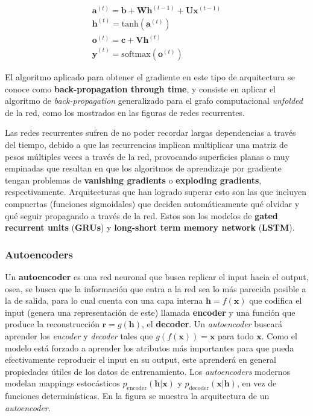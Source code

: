 \begin{equation}
\begin{array}{l}
\bm{a}^{(t)} = \bm{b} + \bm{W}\bm{h}^{(t-1)}+\bm{U}\bm{x}^{(t-1)} \\
\bm{h}^{(t)} = \textrm{tanh}(\bm{a}^{(t)}) \\
\bm{o}^{(t)} = \bm{c} + \bm{V}\bm{h}^{(t)} \\
\hat{\bm{y}}^{(t)} = \textrm{softmax}(\bm{o}^{(t)})
\end{array}
\end{equation}

El algoritmo aplicado para obtener el gradiente en este tipo de arquitectura se conoce como \textbf{back-propagation through time}, y consiste en aplicar el algoritmo de \textit{back-propagation} generalizado para el grafo computacional \textit{unfolded} de la red, como los mostrados en las figuras de redes recurrentes.

Las redes recurrentes sufren de no poder recordar largas dependencias a trav\'es del tiempo, debido a que las recurrencias implican multiplicar una matriz de pesos m\'ultiples veces a trav\'es de la red, provocando superficies planas o muy empinadas que resultan en que los algoritmos de aprendizaje por gradiente tengan problemas de \textbf{vanishing gradients} o \textbf{exploding gradients}, respectivamente. Arquitecturas que han logrado superar esto son las que incluyen compuertas (funciones sigmoidales) que deciden autom\'aticamente qu\'e olvidar y qu\'e seguir propagando a trav\'es de la red. Estos son los modelos de \textbf{gated recurrent units} (\textbf{GRUs}) y \textbf{long-short term memory network} (\textbf{LSTM}).

\subsubsection{Autoencoders}

Un \textbf{autoencoder} es una red neuronal que busca replicar el input hacia el output, osea, se busca que la información que entra a la red sea lo más parecida posible a la de salida, para lo cual cuenta con una capa interna $\bm{h} = f(\bm{x})$ que codifica el input (genera una representaci\'on de este) llamada \textbf{encoder} y una funci\'on que produce la reconstrucci\'on $\bm{r} = g(\bm{h})$, el \textbf{decoder}. Un \textit{autoencoder} buscar\'a aprender los \textit{encoder} y \textit{decoder} tales que $g(f(\bm{x})) = \bm{x}$ para todo $\bm{x}$. Como el modelo est\'a forzado a aprender los atributos m\'as importantes para que pueda efectivamente reproducir el input en su output, este aprender\'a en general propiedades \'utiles de los datos de entrenamiento. Los \textit{autoencoders} modernos modelan mappings estoc\'asticos $p_{\textrm{encoder}}(\bm{h}|\bm{x})$ y $p_{\textrm{decoder}}(\bm{x}|\bm{h})$, en vez de funciones determin\'isticas. En la figura se muestra la arquitectura de un \textit{autoencoder}.

